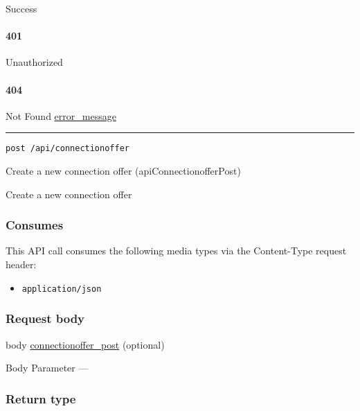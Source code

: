 Success

\hypertarget{section-506}{%
\paragraph{401}\label{section-506}}

Unauthorized \protect\hyperlink{}{}

\hypertarget{section-507}{%
\paragraph{404}\label{section-507}}

Not Found \protect\hyperlink{error_message}{error\_message}

\begin{center}\rule{0.5\linewidth}{\linethickness}\end{center}

\protect\hypertarget{apiConnectionofferPost}{}{}

\begin{verbatim}
post /api/connectionoffer
\end{verbatim}

Create a new connection offer ({apiConnectionofferPost})

Create a new connection offer

\hypertarget{consumes-49}{%
\subsubsection{Consumes}\label{consumes-49}}

This API call consumes the following media types via the {Content-Type}
request header:

\begin{itemize}
\tightlist
\item
  \texttt{application/json}
\end{itemize}

\hypertarget{request-body-49}{%
\subsubsection{Request body}\label{request-body-49}}

body \protect\hyperlink{connectionoffer_post}{connectionoffer\_post}
(optional)

{Body Parameter} ---

\hypertarget{return-type-120}{%
\subsubsection{Return type}\label{return-type-120}}

